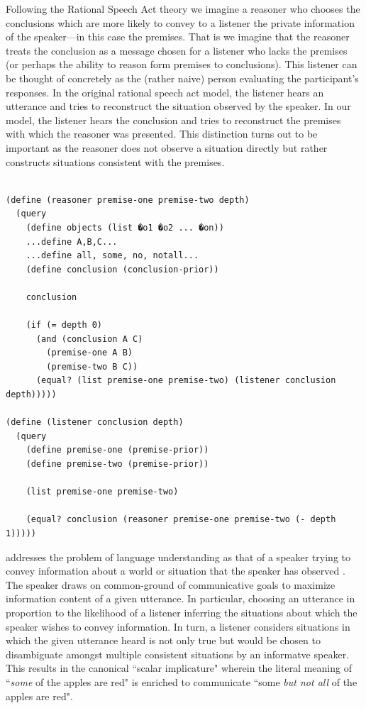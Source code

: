 \documentclass[10pt,letterpaper]{article}
\begin{document}
Following the Rational Speech Act theory \cite{Goodman2013,Frank2012a} we imagine a reasoner who chooses the conclusions which are more likely to convey to a listener the private information of the speaker---in this case the premises. That is we imagine that the reasoner treats the conclusion as a message chosen for a listener who lacks the premises (or perhaps the ability to reason form premises to conclusions).
This listener can be thought of concretely as the (rather naive) person evaluating the participant's responses. In the original rational speech act model, the listener hears an utterance and tries to reconstruct the situation observed by the speaker. In our model, the listener hears the conclusion and tries to reconstruct the premises with which the reasoner was presented. This distinction turns out to be important as the reasoner does not observe a situation directly but rather constructs situations consistent with the premises. 

\begin{lstlisting}

(define (reasoner premise-one premise-two depth)
  (query 
    (define objects (list �o1 �o2 ... �on)) 
    ...define A,B,C...
    ...define all, some, no, notall...
    (define conclusion (conclusion-prior))
 
    conclusion
    
    (if (= depth 0)
      (and (conclusion A C) 
        (premise-one A B)
        (premise-two B C))
      (equal? (list premise-one premise-two) (listener conclusion depth)))))
       
(define (listener conclusion depth)
  (query 
    (define premise-one (premise-prior))
    (define premise-two (premise-prior))
    
    (list premise-one premise-two)
    
    (equal? conclusion (reasoner premise-one premise-two (- depth 1)))))
\end{lstlisting}



addresses the problem of language understanding as that of a speaker trying to convey information about a world or situation that the speaker has observed \cite{Goodman2013,Frank2012a}. The speaker draws on common-ground of communicative goals to maximize information content of a given utterance. In particular, choosing an utterance in proportion to the likelihood of a listener inferring the situations about which the speaker wishes to convey information. In turn, a listener considers situations in which the given utterance heard is not only true but would be chosen to disambiguate amongst multiple consistent situations by an informatve speaker. This results in the canonical ``scalar implicature" wherein the literal meaning of ``{\em some} of the apples are red" is enriched to communicate ``some {\em but not all} of the apples are red".
\end{document}
